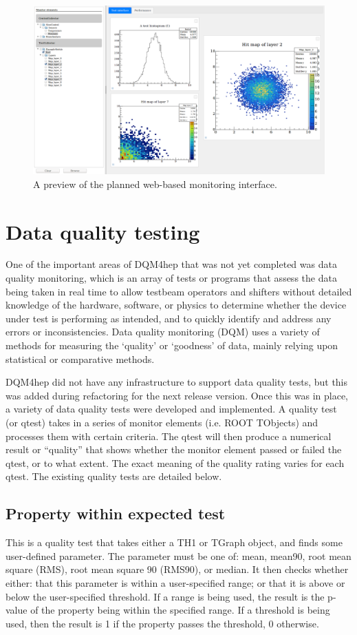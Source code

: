 \begin{figure}
	\centering
	\includegraphics[width=1.0\textwidth]{../Pictures/ScreenshotWebMonitoring.png}
	\caption{A preview of the planned web-based monitoring interface.}
	\label{figure:daq/dqm4hep/future-gui}
\end{figure}

\section{Data quality testing}
One of the important areas of DQM4hep that was not yet completed was data quality monitoring, which is an array of tests or programs that assess the data being taken in real time to allow testbeam operators and shifters without detailed knowledge of the hardware, software, or physics to determine whether the device under test is performing as intended, and to quickly identify and address any errors or inconsistencies. Data quality monitoring (DQM) uses a variety of methods for measuring the `quality' or `goodness' of data, mainly relying upon statistical or comparative methods.

DQM4hep did not have any infrastructure to support data quality tests, but this was added during refactoring for the next release version. Once this was in place, a variety of data quality tests were developed and implemented. A quality test (or qtest) takes in a series of monitor elements (i.e. ROOT TObjects) and processes them with certain criteria. The qtest will then produce a numerical result or ``quality'' that shows whether the monitor element passed or failed the qtest, or to what extent. The exact meaning of the quality rating varies for each qtest. The existing quality tests are detailed below.

\subsection{Property within expected test}
This is a quality test that takes either a TH1 or TGraph object, and finds some user-defined parameter. The parameter must be one of: mean, mean90, root mean square (RMS), root mean square 90 (RMS90), or median. It then checks whether either: that this parameter is within a user-specified range; or that it is above or below the user-specified threshold. If a range is being used, the result is the p-value of the property being within the specified range. If a threshold is being used, then the result is 1 if the property passes the threshold, 0 otherwise.

